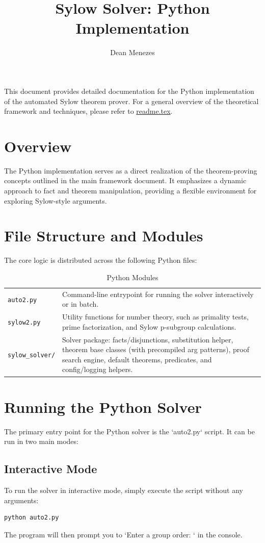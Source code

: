 \documentclass[11pt,oneside]{article}
\title{Sylow Solver: Python Implementation}
\author{Dean Menezes}
\date{}
\begin{document}
\maketitle

This document provides detailed documentation for the Python implementation of the automated Sylow theorem prover. For a general overview of the theoretical framework and techniques, please refer to \href{readme.tex}{readme.tex}.

\section{Overview}
The Python implementation serves as a direct realization of the theorem-proving concepts outlined in the main framework document. It emphasizes a dynamic approach to fact and theorem manipulation, providing a flexible environment for exploring Sylow-style arguments.

\section{File Structure and Modules}
The core logic is distributed across the following Python files:
\begin{table}[h!]\centering
\begin{tabular}{ll}
\texttt{auto2.py} & Command-line entrypoint for running the solver interactively or in batch. \\
\texttt{sylow2.py} & Utility functions for number theory, such as primality tests, prime factorization, and Sylow p-subgroup calculations. \\
\texttt{sylow\_solver/} & Solver package: facts/disjunctions, substitution helper, theorem base classes (with precompiled arg patterns), proof search engine, default theorems, predicates, and config/logging helpers.\end{tabular}
    \caption{Python Modules}
    \label{tab:python_modules}
\end{table}

\section{Running the Python Solver}
The primary entry point for the Python solver is the `auto2.py` script. It can be run in two main modes:

\subsection{Interactive Mode}
To run the solver in interactive mode, simply execute the script without any arguments:
\begin{verbatim}
python auto2.py
\end{verbatim}
The program will then prompt you to `Enter a group order: ` in the console.
\end{document}
